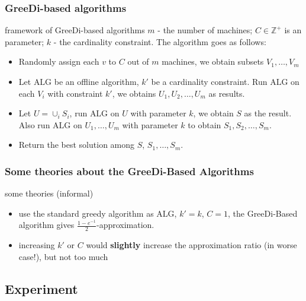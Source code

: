 \documentclass{beamer}
\newcommand{\bbZ}{\mathbb{Z}}
\newcommand{\alg}{\text{ALG}}
\begin{document}
\begin{frame}
  \frametitle{{\sc GreeDi}-based algorithms}
  \begin{block}{framework of {\sc GreeDi}-based algorithms}
    $m$ -  the number of machines; $C \in \bbZ^+$ is an parameter;  $k$ - the cardinality constraint. The algorithm goes as follows:
    \begin{itemize}
    \item Randomly assign each $v$ to $C$ out of $m$ machines, we obtain subsets $V_1, \ldots, V_m$
    \item Let $\alg$ be an offline algorithm, $k'$ be a cardinality constraint. Run $\alg$ on each $V_i$ with constraint $k'$, we obtains $U_1, U_2, \ldots, U_m$ as results.
    \item Let $U = \cup_i S_i$, run $\alg$ on $U$ with parameter $k$, we obtain $S$ as the result. Also run $\alg$ on $U_1, \ldots, U_m$ with parameter $k$ to obtain $S_1, S_2, \ldots, S_m$.
    \item Return the best solution among $S$, $S_1, \ldots, S_m$.
    \end{itemize}

  \end{block}
\end{frame}


\begin{frame}
  \frametitle{Some theories about the {\sc GreeDi}-Based Algorithms}
  \begin{block}{some theories (informal)}
    \begin{itemize}
    \item use the standard greedy algorithm as $\alg$, $k' = k$, $C = 1$, the {\sc GreeDi}-Based algorithm gives $\frac{1-e^{-1}}{2}$-approximation.
    \item increasing $k'$ or $C$ would \textbf{slightly} increase the approximation ratio (in worse case!), but not too much
    \end{itemize}
  \end{block}
  
\end{frame}

\subsection{Experiment}
\end{document}
